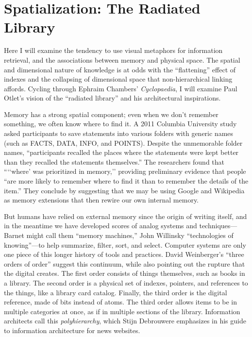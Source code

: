 \section{Spatialization: The Radiated Library}

Here I will examine the tendency to use visual metaphors for information retrieval, and the associations between memory and physical space. The spatial and dimensional nature of knowledge is at odds with the ``flattening'' effect of indexes and the collapsing of dimensional space that non-hierarchical linking affords. Cycling through Ephraim Chambers' \emph{Cyclopaedia}, I will examine Paul Otlet's vision of the ``radiated library'' and his architectural inspirations.

Memory has a strong spatial component; even when we don't remember something, we often know where to find it. A 2011 Columbia University study asked participants to save statements into various folders with generic names (such as FACTS, DATA, INFO, and POINTS). Despite the unmemorable folder names, ``participants recalled the places where the statements were kept better than they recalled the statements themselves.'' The researchers found that ```\thinspace`where' was prioritized in memory,'' providing preliminary evidence that people ``are more likely to remember where to find it than to remember the details of the item.''\autocite{sparrow_google_2011} They conclude by suggesting that we may be using Google and Wikipedia as memory extensions that then rewire our own internal memory.

But humans have relied on external memory since the origin of writing itself, and in the meantime we have developed scores of analog systems and techniques---Barnet might call them ``memory machines,'' John Willinsky ``technologies of knowing''---to help summarize, filter, sort, and select.\autocite{barnet_memory_2013,willinsky_technologies_1999} Computer systems are only one piece of this longer history of tools and practices. David Weinberger's ``three orders of order'' suggest this continuum, while also pointing out the rupture that the digital creates. The first order consists of things themselves, such as books in a library. The second order is a physical set of indexes, pointers, and references to the things, like a library card catalog. Finally, the third order is the digital reference, made of bits instead of atoms.\autocite[17-23]{weinberger_everything_2008} The third order allows items to be in multiple categories at once, as if in multiple sections of the library. Information architects call this \emph{polyhierarchy}, which Stijn Debrouwere emphasizes in his guide to information architecture for news websites.\autocite{debrouwere_information_2010}


